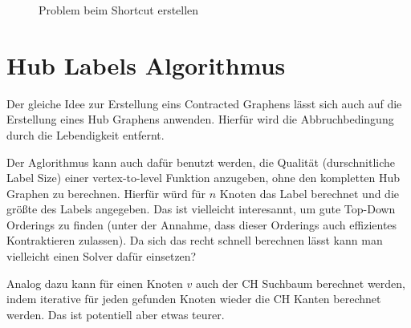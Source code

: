 \begin{figure}[ht]
    \centering

    \caption{Problem beim Shortcut erstellen}
    \label{ch:fig:problem_shortcut}
\end{figure}

\section{Hub Labels Algorithmus}

Der gleiche Idee zur Erstellung eins Contracted Graphens lässt sich auch auf die Erstellung eines Hub Graphens anwenden.
Hierfür wird die Abbruchbedingung durch die Lebendigkeit entfernt.

Der Aglorithmus kann auch dafür benutzt werden, die Qualität (durschnitliche Label Size) einer vertex-to-level Funktion anzugeben, ohne den kompletten Hub Graphen zu berechnen.
Hierfür würd für $n$ Knoten das Label berechnet und die größte des Labels angegeben.
Das ist vielleicht interesannt, um gute Top-Down Orderings zu finden (unter der Annahme, dass dieser Orderings auch effizientes Kontraktieren zulassen).
Da sich das recht schnell berechnen lässt kann man vielleicht einen Solver dafür einsetzen?

Analog dazu kann für einen Knoten $v$ auch der CH Suchbaum berechnet werden, indem iterative für jeden gefunden Knoten wieder die CH Kanten berechnet werden. Das ist potentiell aber etwas teurer.